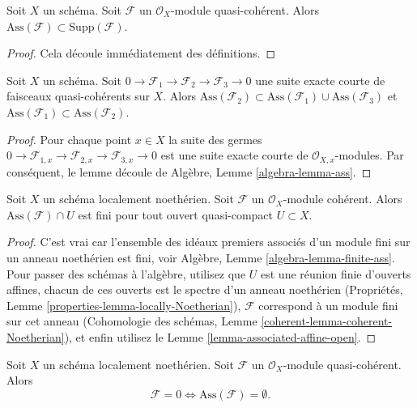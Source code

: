 \begin{lemma}
\label{lemma-ass-support}
Soit  $X$  un schéma. Soit  $\mathcal{F}$  un  $\mathcal{O}_X$-module
quasi-cohérent. Alors  $\text{Ass}(\mathcal{F}) \subset \text{Supp}(\mathcal{F})$.
\end{lemma}

\begin{proof}
Cela découle immédiatement des définitions.
\end{proof}

\begin{lemma}
\label{lemma-ses-ass}
Soit  $X$  un schéma. Soit  $0 \to \mathcal{F}_1 \to \mathcal{F}_2 \to \mathcal{F}_3 \to 0$  une suite exacte courte de
faisceaux quasi-cohérents sur  $X$. Alors  $\text{Ass}(\mathcal{F}_2) \subset
\text{Ass}(\mathcal{F}_1) \cup \text{Ass}(\mathcal{F}_3)$  et  $\text{Ass}(\mathcal{F}_1) \subset \text{Ass}(\mathcal{F}_2)$.
\end{lemma}

\begin{proof}
Pour chaque point  $x \in X$  la suite des germes  $0 \to \mathcal{F}_{1, x} \to \mathcal{F}_{2, x} \to \mathcal{F}_{3, x} \to 0$  est une suite
exacte courte de  $\mathcal{O}_{X, x}$-modules. Par conséquent, le lemme découle de
Algèbre, Lemme  \ref{algebra-lemma-ass}.
\end{proof}

\begin{lemma}
\label{lemma-finite-ass}
Soit  $X$  un schéma localement noethérien. Soit  $\mathcal{F}$  un
 $\mathcal{O}_X$-module cohérent. Alors  $\text{Ass}(\mathcal{F}) \cap U$  est fini pour tout ouvert
quasi-compact  $U \subset X$.
\end{lemma}

\begin{proof}
C'est vrai car l'ensemble des idéaux premiers associés d'un module fini sur un
anneau noethérien est fini, voir Algèbre, Lemme  \ref{algebra-lemma-finite-ass}. Pour passer des
schémas à l'algèbre, utilisez que  $U$  est une réunion finie d'ouverts
affines, chacun de ces ouverts est le spectre d'un anneau noethérien (Propriétés,
Lemme  \ref{properties-lemma-locally-Noetherian}),  $\mathcal{F}$  correspond à un module fini sur cet anneau
(Cohomologie des schémas, Lemme  \ref{coherent-lemma-coherent-Noetherian}), et enfin utilisez le Lemme
 \ref{lemma-associated-affine-open}.
\end{proof}

\begin{lemma}
\label{lemma-ass-zero}
Soit  $X$  un schéma localement noethérien. Soit  $\mathcal{F}$  un
 $\mathcal{O}_X$-module quasi-cohérent. Alors
$$
\mathcal{F} = 0 \Leftrightarrow \text{Ass}(\mathcal{F}) = \emptyset.
$$
\end{lemma}

